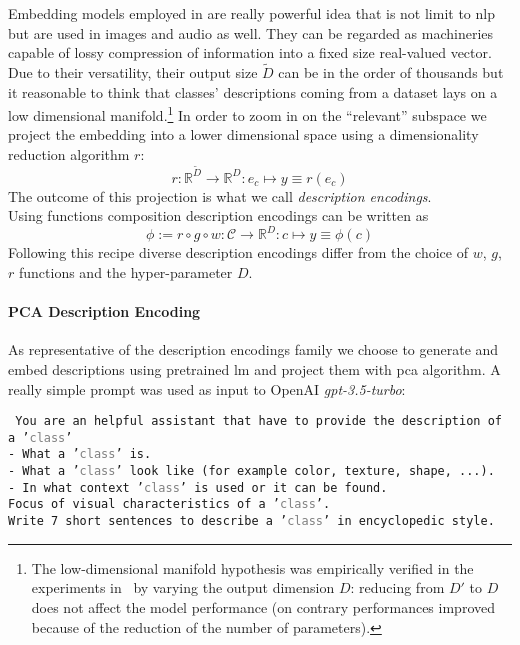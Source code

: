 Embedding models employed in  are really powerful idea that is not limit to \acrshort{nlp} but are used in images and audio as well.
They can be regarded as machineries capable of lossy compression of information into a fixed size real-valued vector. Due to their versatility, their output size $\tilde{D}$ can be in the order of thousands but it reasonable to think that classes' descriptions coming from a dataset lays on a low dimensional manifold.\footnote{The low-dimensional manifold hypothesis was empirically verified in the experiments in~ by varying the output dimension $D$: reducing from $D'$ to $D$ does not affect the model performance (on contrary performances improved because of the reduction of the number of parameters).}
In order to zoom in on the ``relevant'' subspace we project the embedding into a lower dimensional space using a dimensionality reduction algorithm $r$:
\begin{equation}
  r : \mathbb{R}^{\tilde{D}} \to \mathbb{R}^{D} :
  e_c \mapsto y \equiv r(e_c)
  \label{eq:embedding-projection}
\end{equation}
The outcome of this projection is what we call \emph{description encodings}.\\

Using functions composition description encodings can be written as
\begin{equation}
  \phi := r \circ g \circ w : \mathcal{C} \to \mathbb{R}^{D} :
  c \mapsto y \equiv \phi(c)
  \label{eq:desc-encoding}
\end{equation}
Following this recipe diverse description encodings differ from the choice of $w$, $g$, $r$  functions and the hyper-parameter $D$.

\paragraph{PCA Description Encoding}\label{par:encoding-desc} As representative of the description encodings family we choose to generate and embed descriptions using pretrained \acrshort{lm} and project them with \acrfull{pca} algorithm.
A really simple prompt was used as input to OpenAI \emph{gpt-3.5-turbo}:

\vspace{10pt}

\begin{minipage}{0.9\linewidth}
\texttt{\small
You are an helpful assistant that have to provide the description of a
'\textcolor{gray}{\texttt{class}}'\\
- What a '\textcolor{gray}{\texttt{class}}' is.\\
- What a '\textcolor{gray}{\texttt{class}}' look like (for example color,
texture, shape, ...).\\
- In what context '\textcolor{gray}{\texttt{class}}' is used or it can be
found.\\
Focus of visual characteristics of a '\textcolor{gray}{\texttt{class}}'.\\
Write 7 short sentences to describe a '\textcolor{gray}{\texttt{class}}' in
encyclopedic style.
}
\end{minipage}

